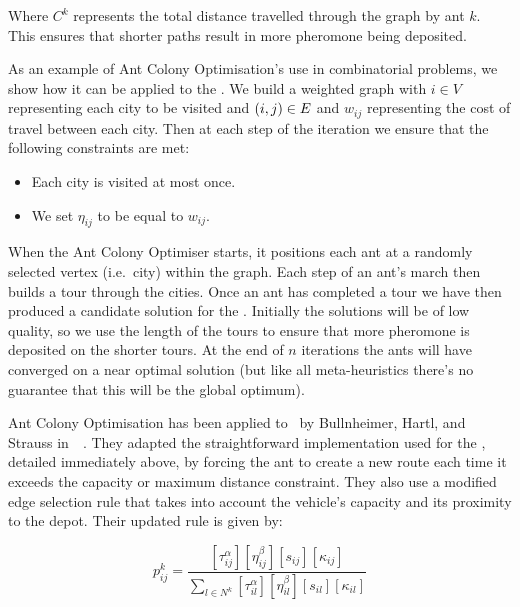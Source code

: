 Where $C^k$ represents the total distance travelled through the graph by ant $k$. This ensures that shorter paths result in more pheromone being deposited.

As an example of Ant Colony Optimisation's use in combinatorial problems, we show how it can be applied to the \TSP. We build a weighted graph with $i \in V$ representing each city to be visited and $(i,j) \in E$ and $w_{ij}$ representing the cost of travel between each city. Then at each step of the iteration we ensure that the following constraints are met:

\begin{itemize}
   \item Each city is visited at most once.
   \item We set $\eta_{ij}$ to be equal to $w_{ij}$.
\end{itemize}

When the Ant Colony Optimiser starts, it positions each ant at a randomly selected vertex (i.e.~city) within the graph. Each step of an ant's march then builds a tour through the cities. Once an ant has completed a tour we have then produced a candidate solution for the \TSP. Initially the solutions will be of low quality, so we use the length of the tours to ensure that more pheromone is deposited on the shorter tours. At the end of $n$ iterations the ants will have converged on a near optimal solution (but like all meta-heuristics there's no guarantee that this will be the global optimum).

 
Ant Colony Optimisation has been applied to \VRP\ by Bullnheimer, Hartl, and Strauss in~\cite{BHS:1999A}~\cite{BHS:1999B}. They adapted the straightforward implementation used for the \TSP, detailed immediately above, by forcing the ant to create a new route each time it exceeds the capacity or maximum distance constraint. They also use a modified edge selection rule that takes into account the vehicle's capacity and its proximity to the depot. Their updated rule is given by:

\[
   p_{ij}^k = \frac{ [\tau_{ij}^{\alpha}] [\eta_{ij}^{\beta}] [s_{ij}] [\kappa_{ij}]  }{ \sum_{l \in N^k} [\tau_{il}^{\alpha}] [\eta_{il}^{\beta}] [s_{il}] [\kappa_{il}] }
\]

